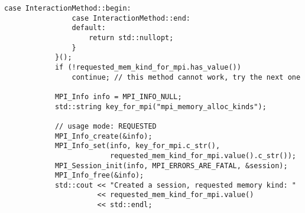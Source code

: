 \begin{example}
\begin{lstlisting}[language={[MPI]C++}]
                case InteractionMethod::begin:
                case InteractionMethod::end:
                default:
                    return std::nullopt;
                }
            }();
            if (!requested_mem_kind_for_mpi.has_value())
                continue; // this method cannot work, try the next one

            MPI_Info info = MPI_INFO_NULL;
            std::string key_for_mpi("mpi_memory_alloc_kinds");

            // usage mode: REQUESTED
            MPI_Info_create(&info);
            MPI_Info_set(info, key_for_mpi.c_str(),
                         requested_mem_kind_for_mpi.value().c_str());
            MPI_Session_init(info, MPI_ERRORS_ARE_FATAL, &session);
            MPI_Info_free(&info);
            std::cout << "Created a session, requested memory kind: "
                      << requested_mem_kind_for_mpi.value()
                      << std::endl;


\end{lstlisting}
\end{example}
